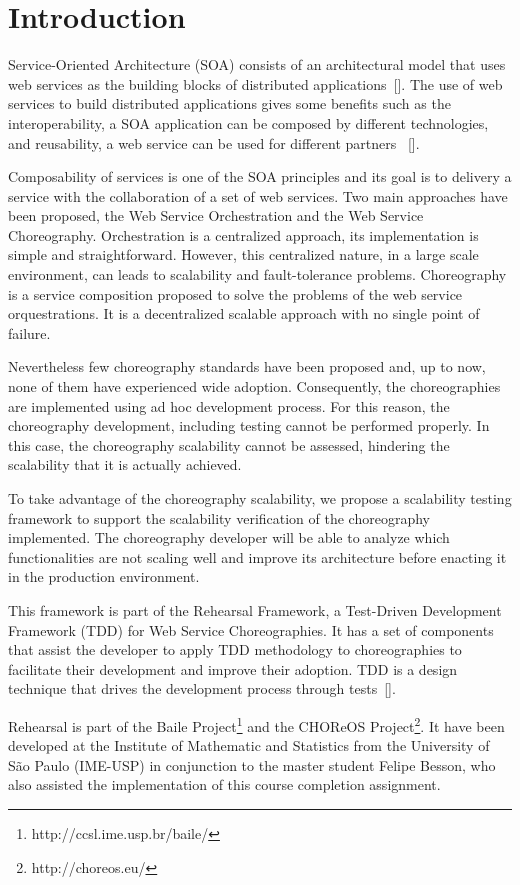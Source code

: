 \section{Introduction}
Service-Oriented Architecture (SOA) consists of an architectural model that uses web services as the building blocks of distributed applications~[\citet{Hew09}]. The use of web services to build distributed applications gives some benefits such as the interoperability, a SOA application can be composed by different technologies, and reusability, a web service can be used for different partners ~[\citet{Bean10}].

Composability of services is one of the SOA principles and its goal is to delivery a service with the collaboration of a set of web services. Two main approaches have been proposed, the Web Service Orchestration and the Web Service Choreography. Orchestration is a centralized approach, its implementation is simple and straightforward. However, this centralized nature, in a large scale environment, can leads to scalability and fault-tolerance problems. Choreography is a service composition proposed to solve the problems of the web service orquestrations. It is a decentralized scalable approach with no single point of failure. 

Nevertheless few choreography standards have been proposed and, up to now, none of them have experienced wide adoption. Consequently, the choreographies are implemented using ad hoc development process. For this reason, the choreography development, including testing cannot be performed properly. In this case, the choreography scalability cannot be assessed, hindering the scalability that it is actually achieved.

To take advantage of the choreography scalability, we propose a scalability testing framework to support the scalability verification of the choreography implemented. The choreography developer will be able to analyze which functionalities are not scaling well and improve its architecture before enacting it in the production environment.

This framework is part of the Rehearsal Framework, a Test-Driven Development Framework (TDD)  for Web Service Choreographies. It has a set of components that assist the developer to apply TDD methodology to choreographies to facilitate their development and improve their adoption. TDD is a design technique that drives the development process through tests~[\citet{Beck02}].  

Rehearsal is part of the Baile Project\footnote{http://ccsl.ime.usp.br/baile/} and the CHOReOS Project\footnote{http://choreos.eu/}. It have been developed at the Institute of Mathematic and Statistics from the University of S\~ao Paulo (IME-USP) in conjunction to the master student Felipe Besson, who also assisted the implementation of this course completion assignment.


